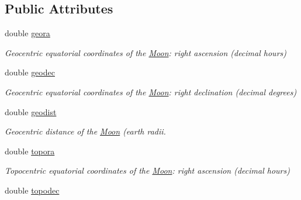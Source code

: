 \subsection*{Public Attributes}
\begin{DoxyCompactItemize}
\item 
\hypertarget{class_moon_aae47ab0bf2d07308ac687a02e5238bfa}{double \hyperlink{class_moon_aae47ab0bf2d07308ac687a02e5238bfa}{geora}}\label{class_moon_aae47ab0bf2d07308ac687a02e5238bfa}

\begin{DoxyCompactList}\small\item\em Geocentric equatorial coordinates of the \hyperlink{class_moon}{Moon}\-: right ascension (decimal hours) \end{DoxyCompactList}\item 
\hypertarget{class_moon_a5d283f111d87bb84512c738305164baf}{double \hyperlink{class_moon_a5d283f111d87bb84512c738305164baf}{geodec}}\label{class_moon_a5d283f111d87bb84512c738305164baf}

\begin{DoxyCompactList}\small\item\em Geocentric equatorial coordinates of the \hyperlink{class_moon}{Moon}\-: right declination (decimal degrees) \end{DoxyCompactList}\item 
\hypertarget{class_moon_a69762767b85c859811ebfc74980cd2f9}{double \hyperlink{class_moon_a69762767b85c859811ebfc74980cd2f9}{geodist}}\label{class_moon_a69762767b85c859811ebfc74980cd2f9}

\begin{DoxyCompactList}\small\item\em Geocentric distance of the \hyperlink{class_moon}{Moon} (earth radii. \end{DoxyCompactList}\item 
\hypertarget{class_moon_aac508669cdf0eec0f6e8b5f65d35e1e7}{double \hyperlink{class_moon_aac508669cdf0eec0f6e8b5f65d35e1e7}{topora}}\label{class_moon_aac508669cdf0eec0f6e8b5f65d35e1e7}

\begin{DoxyCompactList}\small\item\em Topocentric equatorial coordinates of the \hyperlink{class_moon}{Moon}\-: right ascension (decimal hours) \end{DoxyCompactList}\item 
\hypertarget{class_moon_ae5c7b1a08cc02f097dae723cb6a488d9}{double \hyperlink{class_moon_ae5c7b1a08cc02f097dae723cb6a488d9}{topodec}}\label{class_moon_ae5c7b1a08cc02f097dae723cb6a488d9}


\end{DoxyCompactItemize}
